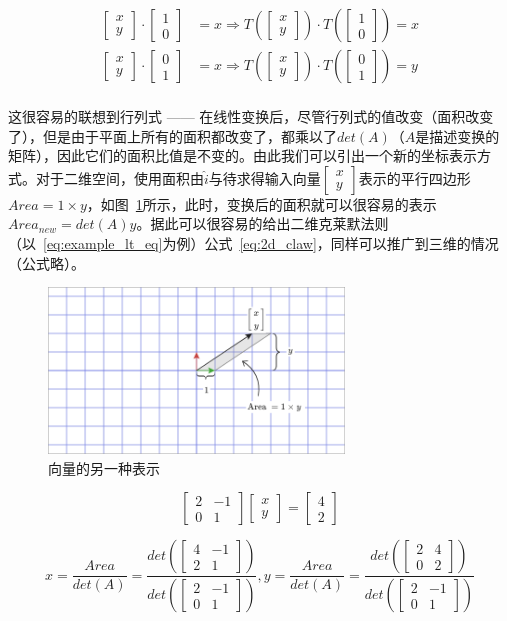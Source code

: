\documentclass[UTF8]{ctexart}
\newcommand{\mat}[1]{\begin{bmatrix} #1 \end{bmatrix}}
\begin{document}
\begin{align}
    \mat{x\\y} \cdot \mat{1\\0} &= x \Rightarrow T(\mat{x\\y}) \cdot T(\mat{1\\0}) = x \\
    \mat{x\\y} \cdot \mat{0\\1} &= x \Rightarrow T(\mat{x\\y}) \cdot T(\mat{0\\1}) = y \\
    \label{eq:not_right_exp}
\end{align}

这很容易的联想到行列式 —— 在线性变换后，尽管行列式的值改变（面积改变了），但是由于平面上所有的面积都改变了，都乘以了$det(A)$（$A$是描述变换的矩阵），因此它们的面积比值是不变的。由此我们可以引出一个新的坐标表示方式。对于二维空间，使用面积由$\hat{i}$与待求得输入向量$\mat{x\\y}$表示的平行四边形$Area = 1 \times y$，如图~\ref{fig:det_exp_point}所示，此时，变换后的面积就可以很容易的表示$Area_{new} = det(A)y$。据此可以很容易的给出二维克莱默法则（以~\ref{eq:example_lt_eq}为例）公式~\ref{eq:2d_claw}，同样可以推广到三维的情况（公式略）。

\begin{figure}[hb]
    \centering
    \includegraphics[width=0.7\textwidth]{./figs/det_exp_point.png}
    \caption{向量的另一种表示}
    \label{fig:det_exp_point}
\end{figure}

\begin{equation}
    \label{eq:example_lt_eq}
    \mat{2&-1\\0&1}\mat{x\\y}=\mat{4\\2}
\end{equation}

\begin{equation}
    \label{eq:2d_claw}
    x = \frac{Area}{det(A)} = \frac{det(\mat{4&-1\\2&1})}{det(\mat{2&-1\\0&1})}, y = \frac{Area}{det(A)} = \frac{det(\mat{2&4\\0&2})}{det(\mat{2&-1\\0&1})}
\end{equation}
\end{document}
